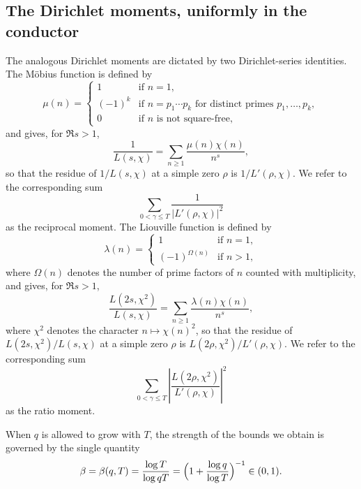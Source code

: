 \documentclass[10pt,a4paper]{amsart}
\numberwithin{equation}{section}
\begin{document}
\subsection{The Dirichlet moments, uniformly in the conductor}
The analogous Dirichlet moments are dictated by two Dirichlet-series identities. The M\"obius function is defined by
\[
\mu(n)=
\begin{cases}
1 & \text{if } n=1,\\
(-1)^{k} & \text{if } n=p_1\dotsm p_k \text{ for distinct primes } p_1,\dotsc,p_k,\\
0 & \text{if } n \text{ is not square-free},
\end{cases}
\]
and gives, for $\Re s>1$,
\begin{equation}\label{eq:mobius-id}
\frac{1}{L(s,\chi)}=\sum_{n\ge1}\frac{\mu(n)\chi(n)}{n^{s}},
\end{equation}
so that the residue of $1/L(s,\chi)$ at a simple zero $\rho$ is $1/L'(\rho,\chi)$. We refer to the corresponding sum 
$$\sum_{0<\gamma\le T}\frac{1}{|L'(\rho,\chi)|^2}$$
as the reciprocal moment. The Liouville function is defined by 
\begin{equation*}
\lambda(n) =
\begin{cases}
1 & \text{if } n = 1, \\
(-1)^{\Omega(n)} & \text{if } n > 1,
\end{cases}
\end{equation*}
where $\Omega(n)$ denotes the number of prime factors of $n$ counted with multiplicity, and gives, for $\Re s>1$,
\begin{equation}\label{eq:liouville-id}
\frac{L(2s,\chi^2)}{L(s,\chi)} = \sum_{n\ge1}\frac{\lambda(n)\chi(n)}{n^s},
\end{equation}
where $\chi^2$ denotes the character $n\mapsto\chi(n)^2$, so that the residue of $L(2s,\chi^2)/L(s,\chi)$ at a simple zero $\rho$ is $L(2\rho,\chi^2)/L'(\rho,\chi)$. We refer to the corresponding sum 
$$\sum_{0<\gamma\le T}\left|\frac{L(2\rho,\chi^2)}{L'(\rho,\chi)}\right|^2$$ 
as the ratio moment.

When $q$ is allowed to grow with $T$, the strength of the bounds we obtain is governed by the single quantity
\begin{equation}\label{eq:beta}
\beta=\beta(q,T)=\frac{\log T}{\log qT}=\Bigl(1+\frac{\log q}{\log T}\Bigr)^{-1}\in(0,1).
\end{equation}
\end{document}
